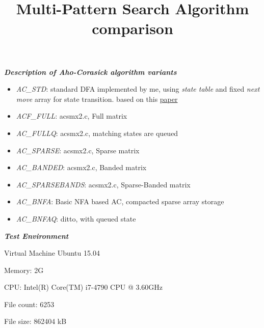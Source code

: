 \documentclass[a4paper]{article}
\begin{document}
\title{Multi-Pattern Search Algorithm comparison}
\author{}
\maketitle


\textbf{\emph{Description of Aho-Corasick algorithm variants}}
\begin{itemize}
\item \emph{AC\_STD}: standard DFA implemented by me, using \textit{state table} and fixed \textit{next move} array for state transition. based on this \hyperlink{effic}{paper}
\item \emph{ACF\_FULL}: acsmx2.c, Full matrix
\item \emph{AC\_FULLQ}: acsmx2.c, matching states are queued
\item \emph{AC\_SPARSE}: acsmx2.c, Sparse matrix
\item \emph{AC\_BANDED}: acsmx2.c, Banded matrix
\item \emph{AC\_SPARSEBANDS}: acsmx2.c, Sparse-Banded matrix
\item \emph{AC\_BNFA}: Basic NFA based AC, compacted sparse array storage
\item \emph{AC\_BNFAQ}: ditto, with queued state
\end{itemize}



\textbf{\emph{Test Environment}}
 \begin{list}{}
 \item  Virtual Machine Ubuntu 15.04
 \item  Memory: 2G
 \item  CPU: Intel(R) Core(TM) i7-4790 CPU @ 3.60GHz
 \item  File count: 6253
 \item  File size: 862404 kB
 \end{list}
\end{document}

